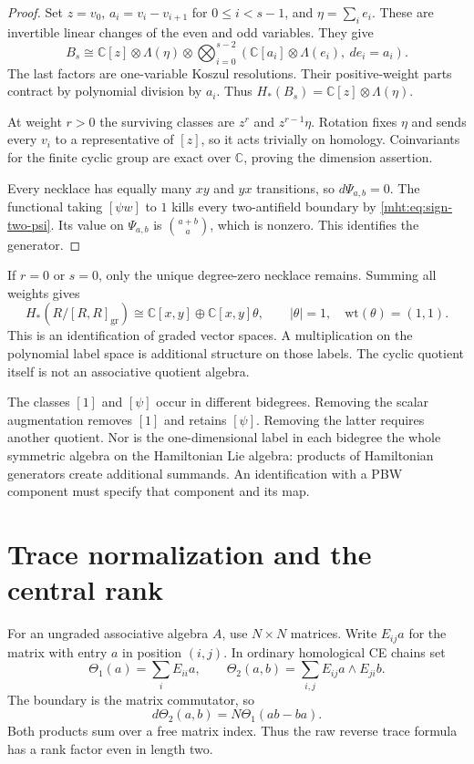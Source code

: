 \begin{proof}
Set $z=v_0$, $a_i=v_i-v_{i+1}$ for $0\leq i<s-1$, and
$\eta=\sum_i e_i$. These are invertible linear changes of
the even and odd variables. They give
\[
 B_s\cong\mathbb C[z]\otimes\Lambda(\eta)\otimes
 \bigotimes_{i=0}^{s-2}
       (\mathbb C[a_i]\otimes\Lambda(e_i),\ de_i=a_i).
\]
The last factors are one-variable Koszul resolutions. Their
positive-weight parts contract by polynomial division by $a_i$.
Thus $H_*(B_s)=\mathbb C[z]\otimes\Lambda(\eta)$.

At weight $r>0$ the surviving classes are $z^r$ and
$z^{r-1}\eta$. Rotation fixes $\eta$ and sends every $v_i$ to
a representative of $[z]$, so it acts trivially on homology.
Coinvariants for the finite cyclic group are exact over
$\mathbb C$, proving the dimension assertion.

Every necklace has equally many $xy$ and $yx$ transitions, so
$d\Psi_{a,b}=0$. The functional taking $[\psi w]$ to $1$
kills every two-antifield boundary by
\eqref{mht:eq:sign-two-psi}. Its value on $\Psi_{a,b}$ is
$\binom{a+b}{a}$, which is nonzero. This identifies the generator.
\end{proof}

If $r=0$ or $s=0$, only the unique degree-zero necklace remains.
Summing all weights gives
\[
 H_*(R/[R,R]_{\mathrm{gr}})
   \cong\mathbb C[x,y]\oplus\mathbb C[x,y]\theta,
 \qquad |\theta|=1,\quad\mathrm{wt}(\theta)=(1,1).
\]
This is an identification of graded vector spaces. A multiplication
on the polynomial label space is additional structure on those
labels. The cyclic quotient itself is not an associative quotient
algebra.

The classes $[1]$ and $[\psi]$ occur in different bidegrees.
Removing the scalar augmentation removes $[1]$ and retains
$[\psi]$. Removing the latter requires another quotient. Nor is
the one-dimensional label in each bidegree the whole symmetric
algebra on the Hamiltonian Lie algebra: products of Hamiltonian
generators create additional summands. An identification with a
PBW component must specify that component and its map.

\section{Trace normalization and the central rank}

For an ungraded associative algebra $A$, use $N\times N$ matrices.
Write $E_{ij}a$ for the matrix with entry $a$ in position $(i,j)$. In ordinary homological CE
chains set
\[
 \Theta_1(a)=\sum_iE_{ii}a,
 \qquad \Theta_2(a,b)=\sum_{i,j}E_{ij}a\wedge E_{ji}b.
\]
The boundary is the matrix commutator, so
\[
 d\Theta_2(a,b)=N\Theta_1(ab-ba).
\]
Both products sum over a free matrix index. Thus the raw reverse
trace formula has a rank factor even in length two.


